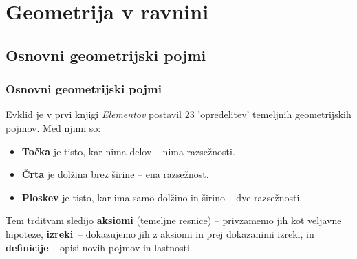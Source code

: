 \section{Geometrija v ravnini}

\begin{frame}
    \sectionpage
\end{frame}

\begin{frame}
\end{frame}

    \subsection{Osnovni geometrijski pojmi}

        \begin{frame}
            \frametitle{Osnovni geometrijski pojmi}

            \begin{block}{}
                Evklid je v prvi knjigi \textit{Elementov} postavil $23$ 'opredelitev' temeljnih geometrijskih pojmov.
                Med njimi so:
                \begin{itemize}
                    \item \textbf{Točka} je tisto, kar nima delov -- nima razsežnosti.
                    \item \textbf{Črta} je dolžina brez širine -- ena razsežnost.
                    \item \textbf{Ploskev} je tisto, kar ima samo dolžino in širino -- dve razsežnosti.
                \end{itemize}
            \end{block}

            \begin{block}{}
                Tem trditvam sledijo \textbf{aksiomi} (temeljne resnice) -- privzamemo jih kot veljavne hipoteze,
                 \textbf{izreki}~-- dokazujemo jih z aksiomi in prej dokazanimi izreki, 
                 in \textbf{definicije} -- opisi novih pojmov in lastnosti.
            \end{block}
        \end{frame}

